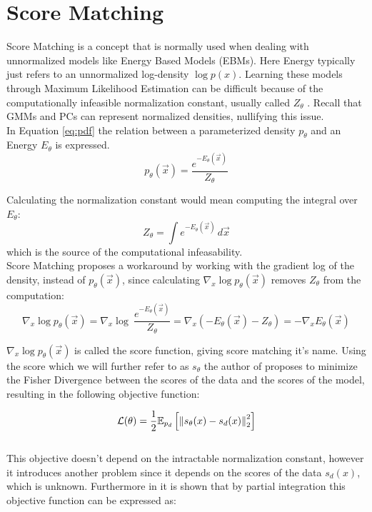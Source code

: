 \section{Score Matching}
\label{sec:sm}

Score Matching \cite{sm} is a concept that is normally used when dealing with unnormalized models like Energy Based Models (EBMs). Here 
Energy typically just refers to an unnormalized log-density $\log p(x)$. 
Learning these models through Maximum Likelihood Estimation can be difficult because of the computationally infeasible normalization 
constant, usually called $Z_\theta$ \cite{sm}. Recall that GMMs and PCs can represent normalized densities, nullifying this issue. \\

In Equation \ref{eq:pdf} the relation between a parameterized density $p_\theta$ and an Energy $E_\theta$ is expressed. 
\begin{equation}
    \label{eq:pdf}
    p_\theta(\vec x) = \frac{e^{-E_\theta(\vec x)}}{Z_\theta}
\end{equation} 

Calculating the normalization constant would mean computing the integral over $E_\theta$: 
\[
    Z_\theta = \int e^{-E_\theta(\vec{x})} \, d\vec{x}
\]
which is the source of the computational infeasability. \\

Score Matching proposes a workaround by working with the gradient log of the density, 
instead of $p_\theta(\vec x)$, since calculating $\nabla_x \log p_\theta(\vec x)$ removes $Z_\theta$ from the computation:
\[
    \nabla_x \log p_\theta(\vec x) = \nabla_x \log \ \frac{e^{- E_\theta(\vec x)}}{Z_\theta} = \nabla_x \left( - E_\theta(\vec x) - {Z_\theta} \right) = - \nabla_x E_\theta(\vec x)
\] 

$\nabla_x \log p_\theta(\vec x)$ is called the score function, giving score matching it's name.
Using the score which we will further refer to as $s_\theta$ the author of \cite{sm} proposes to minimize the Fisher Divergence between 
the scores of the data and the scores of the model, resulting in the following objective function: 

\begin{equation}
    \label{eq:fisher}
    \mathcal{L}(\theta) = \frac{1}{2} \mathbb{E}_{p_d} \left[ \left\lVert s_\theta(x) - s_d(x)\right\rVert^2_2 \right]
\end{equation} \\

This objective doesn't depend on the intractable normalization constant, however it introduces another problem since it depends on the scores of the data 
$s_d(x)$, which is unknown. Furthermore in \cite{sm} it is shown that by partial integration this objective function can be expressed as:

